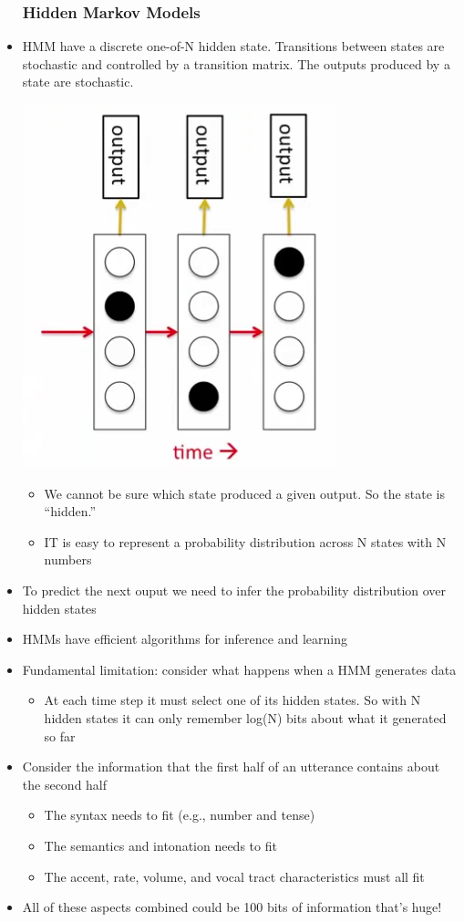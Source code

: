 \begin{itemize}
	\subsubsection{Hidden Markov Models}
	\item HMM have a discrete one-of-N hidden state. Transitions between states are stochastic and controlled by a transition matrix. The outputs produced by a state are stochastic.
	\begin{center}
		\includegraphics[scale=0.7]{sections/7/hmm.png}
	\end{center}
	\begin{itemize}
		\item We cannot be sure which state produced a given output. So the state is ``hidden.''
		\item IT is easy to represent a probability distribution across N states with N numbers
	\end{itemize}
	\item To predict the next ouput we need to infer the probability distribution over hidden states
	\item HMMs have efficient algorithms for inference and learning
	\item Fundamental limitation: consider what happens when a HMM generates data
	\begin{itemize}
		\item At each time step it must select one of its hidden states. So with N hidden states it can only remember log(N) bits about what it generated so far
	\end{itemize}
	\item Consider the information that the first half of an utterance contains about the second half
	\begin{itemize}
		\item The syntax needs to fit (e.g., number and tense)
		\item The semantics and intonation needs to fit
		\item The accent, rate, volume, and vocal tract characteristics must all fit 
	\end{itemize}
	\item All of these aspects combined could be 100 bits of information that's huge! 


\end{itemize}
